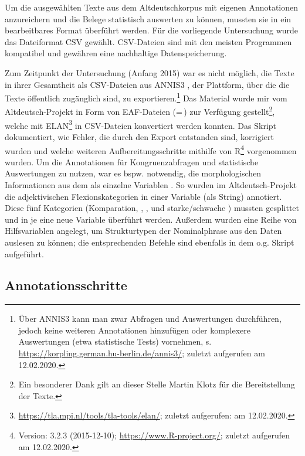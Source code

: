 Um die ausgewählten Texte aus dem Altdeutschkorpus  mit eigenen Annotationen  anzureichern und die Belege statistisch auswerten zu können, mussten sie in ein bearbeitbares Format überführt werden. Für die vorliegende Untersuchung wurde das Dateiformat CSV gewählt. CSV-Dateien sind mit den meisten Programmen kompatibel und gewähren eine nachhaltige Datenspeicherung. 

Zum Zeitpunkt der Untersuchung (Anfang 2015) war es nicht möglich, die Texte in ihrer Gesamtheit als CSV-Dateien aus ANNIS3 \parencite{Krause2016}, der Plattform, über die die Texte öffentlich zugänglich sind, zu exportieren.\footnote{Über ANNIS3 kann man zwar Abfragen und Auswertungen durchführen, jedoch keine weiteren Annotationen  hinzufügen oder komplexere Auswertungen (etwa statistische Tests) vornehmen, s. \url{https://korpling.german.hu-berlin.de/annis3/}; zuletzt aufgerufen am 12.02.2020.} Das Material wurde mir vom Altdeutsch-Projekt in Form von EAF-Dateien (=\,) zur Verfügung gestellt\footnote{Ein besonderer Dank gilt an dieser Stelle Martin Klotz für die Bereitstellung der Texte.}, welche mit ELAN\footnote{\url{https://tla.mpi.nl/tools/tla-tools/elan/}; zuletzt aufgerufen: am 12.02.2020.} in CSV-Dateien konvertiert werden konnten. 
Das Skript  \parencite{HZKYL4_2020} dokumentiert, wie Fehler, die durch den Export entstanden sind, korrigiert wurden und welche weiteren Aufbereitungsschritte mithilfe von R\footnote{Version: 3.2.3 (2015-12-10); \url{https://www.R-project.org/}; zuletzt aufgerufen am 12.02.2020.} vorgenommen wurden. 
Um die Annotationen  für Kongruenzabfragen und statistische Auswertungen zu nutzen, war es bspw. notwendig, die morphologischen Informationen aus dem  als einzelne Variablen . So wurden im Altdeutsch-Projekt die adjektivischen  Flexionskategorien in einer Variable (als String)  annotiert. Diese fünf Kategorien (Komparation, , ,  und starke/schwache ) mussten gesplittet und in je eine neue Variable überführt werden. Außerdem wurden eine Reihe von Hilfsvariablen angelegt, um Strukturtypen  der Nominalphrase  aus den Daten auslesen zu können; die entsprechenden Befehle sind ebenfalls in dem o.g. Skript aufgeführt.  

\subsection{Annotationsschritte}\label{sec:annotationsschritte}

